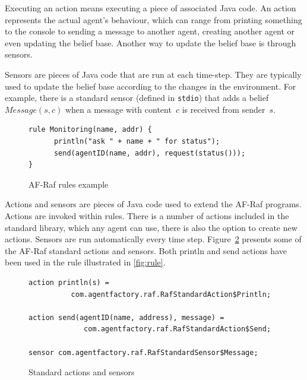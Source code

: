 \documentclass[a4paper,12pt,oneside,fleqn]{book} %
\begin{document}
Executing an action means executing a piece of associated Java code.
An action represents the actual agent's behaviour, which can
range from printing something to the console to sending a message to
another agent, creating another agent or even updating the belief base.
Another way to update the belief base is through sensors.

Sensors are pieces of Java code that are run at each time-step. They are
typically used to update the belief base according to the changes in the
environment. For example, there is a standard sensor (defined in
\texttt{stdio}) that adds a belief $\mathit{Message}(s,c)$ when a message
with content~$c$ is received from sender~$s$.



\begin{figure}\footnotesize %
\begin{verbatim}
rule Monitoring(name, addr) {
      println("ask " + name + " for status");
      send(agentID(name, addr), request(status()));
}
\end{verbatim}
\caption{AF-Raf rules example}
\label{fig:rule}
\end{figure} %

Actions and sensors are pieces of Java code used to extend the AF-Raf
programs. Actions are invoked within rules. There is a number of actions
included in the standard library, which any agent can use, there is also
the option to create new actions. Sensors are run automatically every time
step. Figure~\ref{fig:actions-sensors} presents some of the AF-Raf standard
actions and sensors. Both {\sf println} and {\sf send} actions have been
used in the rule illustrated in \autoref{fig:rule}.


\begin{figure}\footnotesize %
\begin{verbatim}
action println(s) =
          com.agentfactory.raf.RafStandardAction$Println;

action send(agentID(name, address), message) =
             com.agentfactory.raf.RafStandardAction$Send;

sensor com.agentfactory.raf.RafStandardSensor$Message;
\end{verbatim}
\caption{Standard actions and sensors}
\label{fig:actions-sensors}
\end{figure} %
\end{document}
